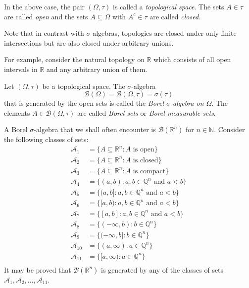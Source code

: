 In the above case, the pair $(\Omega,\tau)$ is called a \textit{topological space}. The sets $A\in\tau$ are called \textit{open} and the sets $A\subseteq\Omega$ with $A^c\in\tau$ are called \textit{closed}.

\vspace{1mm}
Note that in contrast with $\sigma$-algebras, topologies are closed under only finite intersections but are also closed under arbitrary unions.

\vspace{2mm}
For example, consider the natural topology on $\mathbb{R}$ which consists of all open intervals in $\mathbb{R}$ and any arbitrary union of them.

\begin{definition}
    Let $(\Omega,\tau)$ be a topological space. The $\sigma$-algebra
    $$\mathcal{B}(\Omega)=\mathcal{B}(\Omega,\tau)=\sigma(\tau)$$
    that is generated by the open sets is called the \textit{Borel $\sigma$-algebra on $\Omega$}. The elements $A\in\mathcal{B}(\Omega,\tau)$ are called \textit{Borel sets} or \textit{Borel measurable sets}.
\end{definition}


A Borel $\sigma$-algebra that we shall often encounter is $\mathcal{B}(\mathbb{R}^n)$ for $n\in\mathbb{N}$. Consider the following classes of sets:
\begin{align*}
    \mathcal{A}_1 &= \{A\subseteq\mathbb{R}^n:A\text{ is open}\} \\
    \mathcal{A}_2 &= \{A\subseteq\mathbb{R}^n:A\text{ is closed}\} \\
    \mathcal{A}_3 &= \{A\subseteq\mathbb{R}^n:A\text{ is compact}\} \\
    \mathcal{A}_4 &= \{(a,b):a,b\in\mathbb{Q}^n\text{ and }a<b\} \\
    \mathcal{A}_5 &= \{(a,b]:a,b\in\mathbb{Q}^n\text{ and }a<b\} \\
    \mathcal{A}_6 &= \{[a,b):a,b\in\mathbb{Q}^n\text{ and }a<b\} \\
    \mathcal{A}_7 &= \{[a,b]:a,b\in\mathbb{Q}^n\text{ and }a<b\} \\
    \mathcal{A}_8 &= \{(-\infty,b):b\in\mathbb{Q}^n\} \\
    \mathcal{A}_9 &= \{(-\infty,b]:b\in\mathbb{Q}^n\} \\
    \mathcal{A}_{10} &= \{(a,\infty):a\in\mathbb{Q}^n\} \\
    \mathcal{A}_{11} &= \{[a,\infty):a\in\mathbb{Q}^n\} \\
\end{align*}
It may be proved that $\mathcal{B}(\mathbb{R}^n)$ is generated by any of the classes of sets $\mathcal{A}_1,\mathcal{A}_2,\ldots,\mathcal{A}_{11}$.

